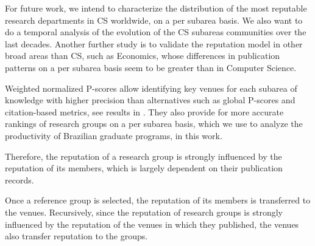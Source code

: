 


For future work, we intend to characterize the distribution of the most reputable research departments in CS worldwide, on a per subarea basis. We also want to do a temporal analysis of the evolution of the CS subareas communities over the last decades. Another further study is to validate the reputation model in other broad areas than CS, such as Economics, whose differences in publication patterns on a per subarea basis seem to be greater than in Computer Science.


Weighted normalized P-scores allow identifying key venues for each subarea of knowledge with higher precision than alternatives such as global P-scores and citation-based metrics, see results in \cite{ueda17ictir}. They also provide for more accurate rankings of research groups on a per subarea basis, which we use to analyze the productivity of Brazilian graduate programs, in this work.


Therefore, the reputation of a research group is strongly influenced by the reputation of its members, which is largely dependent on their publication records.

Once a reference group is selected, the reputation of its members is transferred to the venues. Recursively, since the reputation of research groups is strongly influenced by the reputation of the venues in which they published, the venues also transfer reputation to the groups.


